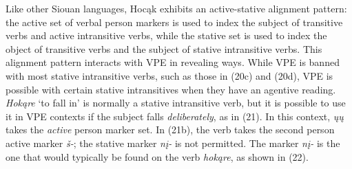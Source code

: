 \documentclass[output=paper]{LSP/langsci}
\begin{document}
\begin{exe}
\ex
\begin{xlist}
\end{xlist}
\end{exe}

Like other Siouan languages, Hoc\k{a}k exhibits an active-stative alignment pattern: the active set of verbal person markers is used to index the subject of transitive verbs and active intransitive verbs, while the stative set is used to index the object of transitive verbs and the subject of stative intransitive verbs. This alignment pattern interacts with VPE in revealing ways. While VPE is banned with most stative intransitive verbs, such as those in (20c) and (20d), VPE is possible with certain stative intransitives when they have an agentive reading. \emph{Hok\k{a}re} `to fall in' is normally a stative intransitive verb, but it is possible to use it in VPE contexts if the subject falls \emph{deliberately}, as in (21). In this context, \emph{\k{u}\k{u}} takes the \emph{active} person marker set. In (21b), the verb takes the second person active marker \emph{\v{s}-}; the stative marker \emph{n\k{i}-} is not permitted. The marker \emph{n\k{i}-} is the one that would typically be found on the verb \emph{hok\k{a}re}, as shown in (22).
\end{document}

